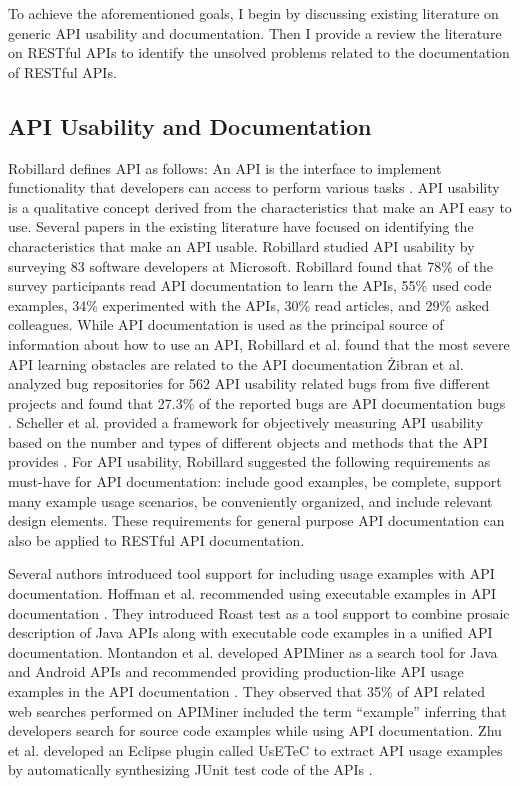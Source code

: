 \documentclass[11pt,oneside]{book}
\begin{document}
To achieve the aforementioned goals, I begin by discussing existing literature on generic API usability and documentation. Then I provide a review the literature on RESTful APIs to identify the unsolved problems related to the documentation of RESTful APIs.


\subsection{API Usability and Documentation}

Robillard defines API as follows: An API is the interface to implement functionality that developers can access to perform various tasks \cite{Robillard_a_field_study} \cite{Robillard_what_makes}. API usability is a qualitative concept derived from the characteristics that make an API easy to use. Several papers in the existing literature have focused on identifying the characteristics that make an API usable. Robillard studied API usability by surveying 83 software developers at Microsoft. Robillard found that 78\% of the survey participants read API documentation to learn the APIs, 55\% used code examples, 34\% experimented with the APIs, 30\% read articles, and 29\% asked colleagues. While API documentation is used as the principal source of information about how to use an API, Robillard et al. found that the most severe API learning obstacles are related to the API documentation \cite{Robillard_a_field_study} \. Zibran et al. analyzed bug repositories  for 562 API usability related bugs from five different projects and found that 27.3\% of the reported bugs are API documentation bugs \cite{zibran2011useful}. Scheller et al. provided a framework for objectively measuring API usability based on the number and types of different objects and methods that the API provides \cite{scheller2015automated}. For API usability, Robillard suggested the following requirements as must-have for API documentation: include good examples, be complete, support many example usage scenarios, be conveniently organized, and include relevant design elements. These requirements for general purpose API documentation can also be applied to RESTful API documentation.

Several authors introduced tool support for including usage examples with API documentation. Hoffman et al. recommended using executable examples in API documentation \cite{Hoffman_api_documentation}. They introduced Roast test as a tool support  to combine prosaic description of Java APIs along with executable code examples in a unified API documentation. Montandon et al. developed APIMiner as a search tool for Java and Android APIs and recommended providing production-like API usage examples in the API documentation \cite{montandon2013documenting}. They observed that 35\% of API related web searches performed on APIMiner included the term “example” inferring that developers search for source code examples while using API documentation. Zhu et al. developed an Eclipse plugin called UsETeC to extract API usage examples by automatically synthesizing JUnit test code of the APIs \cite{zhu2014mining}.
\end{document}
